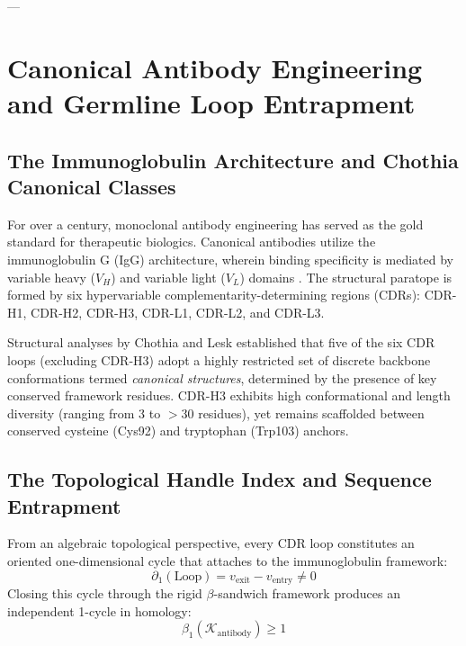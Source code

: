 ---

\section{Canonical Antibody Engineering and Germline Loop Entrapment}
\label{sec:antibody_engineering}

\subsection{The Immunoglobulin Architecture and Chothia Canonical Classes}
For over a century, monoclonal antibody engineering has served as the gold standard for therapeutic biologics. Canonical antibodies utilize the immunoglobulin G (IgG) architecture, wherein binding specificity is mediated by variable heavy ($V_H$) and variable light ($V_L$) domains \cite{almagro2019antibody}. The structural paratope is formed by six hypervariable complementarity-determining regions (CDRs): CDR-H1, CDR-H2, CDR-H3, CDR-L1, CDR-L2, and CDR-L3.

Structural analyses by Chothia and Lesk \cite{chothia1987canonical} established that five of the six CDR loops (excluding CDR-H3) adopt a highly restricted set of discrete backbone conformations termed \textit{canonical structures}, determined by the presence of key conserved framework residues. CDR-H3 exhibits high conformational and length diversity (ranging from 3 to $>30$ residues), yet remains scaffolded between conserved cysteine (Cys92) and tryptophan (Trp103) anchors.

\subsection{The Topological Handle Index and Sequence Entrapment}
From an algebraic topological perspective, every CDR loop constitutes an oriented one-dimensional cycle that attaches to the immunoglobulin framework:
\begin{equation}
    \partial_1(\text{Loop}) = v_{\text{exit}} - v_{\text{entry}} \ne 0
\end{equation}
Closing this cycle through the rigid $\beta$-sandwich framework produces an independent 1-cycle in homology:
\begin{equation}
    \beta_1(\mathcal{K}_{\text{antibody}}) \ge 1
\end{equation}

